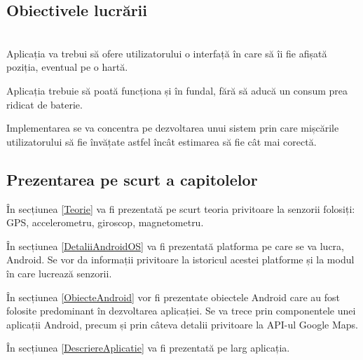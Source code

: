 \documentclass[12pt,a4paper]{article}
\begin{document}
\newpage
\subsection{Obiectivele lucrării}
\\

Aplicația va trebui să ofere utilizatorului o interfață în care să îi fie afișată poziția, eventual pe o hartă.

Aplicația trebuie să poată funcționa și în fundal, fără să aducă un consum prea ridicat de baterie.

Implementarea se va concentra pe dezvoltarea unui sistem prin care mișcările utilizatorului să fie învățate astfel încât estimarea să fie cât mai corectă.\\

\subsection{Prezentarea pe scurt a capitolelor}

În secțiunea \ref{Teorie} va fi prezentată pe scurt teoria privitoare la senzorii folosiți: GPS, accelerometru, giroscop, magnetometru.

În secțiunea \ref{DetaliiAndroidOS} va fi prezentată platforma pe care se va lucra, Android. Se vor da informații privitoare la istoricul acestei platforme și la modul în care lucrează senzorii.

În secțiunea \ref{ObiecteAndroid} vor fi prezentate obiectele Android care au fost folosite predominant în dezvoltarea aplicației. Se va trece prin componentele unei aplicații Android, precum și prin câteva detalii privitoare la API-ul Google Maps.

În secțiunea \ref{DescriereAplicatie} va fi prezentată pe larg aplicația.
\end{document}
